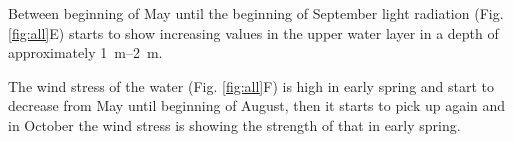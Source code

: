 \documentclass[../Main.tex]{subfiles}
\begin{document}
Between beginning of May until the beginning of September light radiation (Fig. \ref{fig:all}E) starts to show increasing values in the upper water layer in a depth of approximately \SIrange{1}{2}{\metre}.

The wind stress of the water (Fig. \ref{fig:all}F) is high in early spring and start to decrease from May until beginning of August, then it starts to pick up again and in October the wind stress is showing the strength of that in early spring. 
\end{document}

